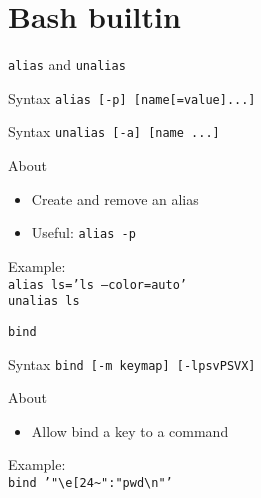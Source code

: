 \documentclass[10pt, compress, aspectratio=169]{beamer}
\begin{document}
\section{Bash builtin}
\begin{frame}{\texttt{alias} and \texttt{unalias}}
  \begin{alertblock}{Syntax}
    \texttt{alias [-p] [name[=value]...]}
  \end{alertblock}

  \begin{alertblock}{Syntax}
    \texttt{unalias [-a] [name ...]}
  \end{alertblock}

  \begin{exampleblock}{About}
    \begin{itemize}
      \item Create and remove an alias
      \item Useful: \texttt{alias -p}
    \end{itemize}
  \end{exampleblock}
  Example: \\
  \texttt{alias ls='ls --color=auto'} \\
  \texttt{unalias ls} \\
\end{frame}

\begin{frame}{\texttt{bind}}
  \begin{alertblock}{Syntax}
    \texttt{bind [-m keymap] [-lpsvPSVX]}
  \end{alertblock}

  \begin{exampleblock}{About}
    \begin{itemize}
      \item Allow bind a key to a command
    \end{itemize}
  \end{exampleblock}
  Example: \\
  \texttt{bind '"\textbackslash{e}[24\textasciitilde":"pwd\textbackslash{n}"'}
\end{frame}
\end{document}
